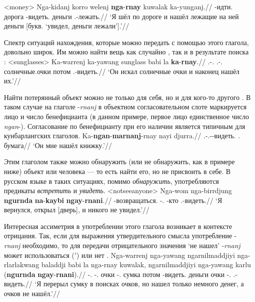 \ex<money>\begingl
\gla Nga-kidanj korro welenj \textbf{nga}-\textbf{rnay} kuwalak ka-yunganj.//
\glb \nga-идти.\Pst{} \korro{} дорога \nga-видеть.\Pst{} деньги \Tsg.\Real-лежать.\Pst{}//
\glft `Я шёл по дороге и нашёл лежащие на ней деньги [букв. `увидел, деньги лежали'].'//%
\endgl\xe

Спектр ситуаций нахождения, которые можно передать с помощью этого глагола, довольно широк. Им можно найти вещь как случайно , так и в результате поиска :
\ex<sunglasses>\begingl
\gla Ka-warrenj ka-yawang sunglass babi la \textbf{ka}-\textbf{rnay}.//
\glb \Tsg.\Real-\warre.\Pst{} \Tsg.\Real-\yaw.\Pst{} солнечные.очки потом \la{} \Tsg.\Real-видеть.\Pst{}//
\glft `Он искал солнечные очки и наконец нашёл их.'//%
\endgl\xe

Найти потерянный объект можно не только для себя, но и для кого-то другого . В таком случае на глаголе -\textit{rnanj} в объектном согласовательном слоте маркируется лицо и число бенефицианта (в данном примере, первое лицо единственное число \textit{ngan}-). Согласование по бенефицианту при его наличии является типичным для кунбарлангских глаголов. 
\begingl
\gla Ka-\textbf{ngan}-\textbf{marnanj}-rnay nayi djurra.//
\glb \Tsg.\Real-\Fsg.\Obj-\Ben-видеть.\Pst{} \Nm.\Cli{} бумага//
\glft `Он мне нашёл книжку.'//%
\endgl\xe

Этим глаголом также можно обнаружить (или не обнаружить, как в примере  ниже) объект или человека --- то есть найти его, но не присвоить в себе. В русском языке в таких ситуациях, помимо \textit{обнаружить}, употребляются предикаты \textit{встретить} и \textit{увидеть}.
\ex<notseeanyone>\begingl
\gla Nga-wom nga-birrdjung \textbf{ngurnda} \textbf{na}-\textbf{kaybi} \textbf{ngay}-\textbf{rnani}.//
\glb \nga-возвращаться.\Pst{} \nga-\bdj.\Pst{} \Neg{} \Cli-кто \Fsg.\irrpst-видеть.\irrpst{}//
\glft `Я вернулся, открыл [дверь], и никого не увидел.'//%
\endgl\xe

Интересная ассиметрия в употреблении этого глагола возникает в контексте отрицания. Так, если для выражения утвердительного смысла употребление -\textit{rnanj} необходимо, то для передачи отрицательного значения `не нашел' -\textit{rnanj} может использоваться ($'$) или нет .
\ex[exno={\getref{bag}$'$}]\begingl
\gla Nga-warrenj nga-yawang ngarnilmaddjiyi nga-rlarlakwang baladdji babi la nga-rnay kuwalak, ngarnilmaddjiyi nga-yawang karlu (\textbf{ngurnda} \textbf{ngay}-\textbf{rnani}).//
\glb \nga-\warre.\Pst{} \nga-\yaw.\Pst{} очки \nga-\rlk.\Pst{} сумка потом \la{} \nga-видеть.\Pst{} деньги очки \nga-\yaw.\Pst{} \karlu{} \phantom{(}\Neg{} \Fsg.\irrpst-видеть.\irrpst{}//
\glft `Я перерыл сумку в поисках очков, но нашел только немного денег, а очков не нашёл.'//%
\endgl\xe

